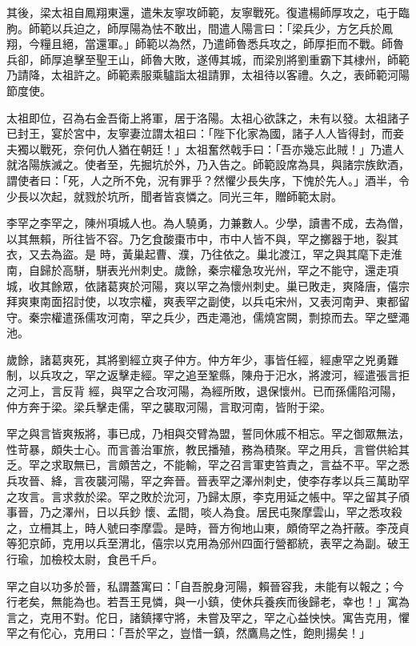 \begin{pinyinscope}
 其後，梁太祖自鳳翔東還，遣朱友寧攻師範，友寧戰死。復遣楊師厚攻之，屯于臨朐。師範以兵迫之，師厚陽為怯不敢出，間遣人陽言曰：「梁兵少，方乞兵於鳳翔，今糧且絕，當還軍。」師範以為然，乃遣師魯悉兵攻之，師厚拒而不戰。師魯兵卻，師厚追擊至聖王山，師魯大敗，遂傅其城，而梁別將劉重霸下其棣州，師範乃請降，太祖許之。師範素服乘驢詣太祖請罪，太祖待以客禮。久之，表師範河陽節度使。



 太祖即位，召為右金吾衛上將軍，居于洛陽。太祖心欲誅之，未有以發。太祖諸子
 已封王，宴於宮中，友寧妻泣謂太祖曰：「陛下化家為國，諸子人人皆得封，而妾夫獨以戰死，奈何仇人猶在朝廷！」太祖奮然戟手曰：「吾亦幾忘此賊！」乃遣人就洛陽族滅之。使者至，先掘坑於外，乃入告之。師範設席為具，與諸宗族飲酒，謂使者曰：「死，人之所不免，況有罪乎？然懼少長失序，下愧於先人。」酒半，令少長以次起，就戮於坑所，聞者皆哀憐之。同光三年，贈師範太尉。



 李罕之李罕之，陳州項城人也。為人驍勇，力兼數人。少學，讀書不成，去為僧，以其無賴，所往皆不容。乃乞食酸棗市中，市中人皆不與，罕之擲器于地，裂其衣，又去為盜。是
 時，黃巢起曹、濮，乃往依之。巢北渡江，罕之與其麾下走淮南，自歸於高駢，駢表光州刺史。歲餘，秦宗權急攻光州，罕之不能守，還走項城，收其餘眾，依諸葛爽於河陽，爽以罕之為懷州刺史。巢已敗走，爽降唐，僖宗拜爽東南面招討使，以攻宗權，爽表罕之副使，以兵屯宋州，又表河南尹、東都留守。秦宗權遣孫儒攻河南，罕之兵少，西走澠池，儒燒宮闕，剽掠而去。罕之壁澠池。



 歲餘，諸葛爽死，其將劉經立爽子仲方。仲方年少，事皆任經，經慮罕之兇勇難制，以兵攻之，罕之返擊走經。罕之追至鞏縣，陳舟于汜水，將渡河，經遣張言拒之河上，言反背
 經，與罕之合攻河陽，為經所敗，退保懷州。已而孫儒陷河陽，仲方奔于梁。梁兵擊走儒，罕之襲取河陽，言取河南，皆附于梁。



 罕之與言皆爽叛將，事已成，乃相與交臂為盟，誓同休戚不相忘。罕之御眾無法，性苛暴，頗失士心。而言善治軍旅，教民播殖，務為積聚。罕之用兵，言嘗供給其乏。罕之求取無已，言頗苦之，不能輸，罕之召言軍吏笞責之，言益不平。罕之悉兵攻晉、絳，言夜襲河陽，罕之奔晉。晉表罕之澤州刺史，使李存孝以兵三萬助罕之攻言。言求救於梁。罕之敗於沇河，乃歸太原，李克用延之帳中。罕之留其子頎事晉，乃之澤州，日以兵鈔
 懷、孟間，啖人為食。居民屯聚摩雲山，罕之悉攻殺之，立柵其上，時人號曰李摩雲。是時，晉方徇地山東，頗倚罕之為扞蔽。李茂貞等犯京師，克用以兵至渭北，僖宗以克用為邠州四面行營都統，表罕之為副。破王行瑜，加檢校太尉，食邑千戶。



 罕之自以功多於晉，私謂蓋寓曰：「自吾脫身河陽，賴晉容我，未能有以報之；今行老矣，無能為也。若吾王見憐，與一小鎮，使休兵養疾而後歸老，幸也！」寓為言之，克用不對。佗日，諸鎮擇守將，未嘗及罕之，罕之心益怏怏。寓告克用，懼罕之有佗心，克用曰：「吾於罕之，豈惜一鎮，然鷹鳥之性，飽則揚矣！」




\end{pinyinscope}
